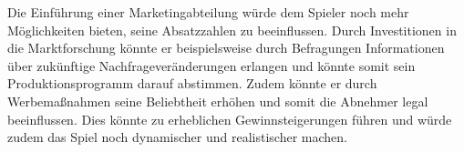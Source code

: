Die Einführung einer Marketingabteilung würde dem Spieler noch mehr Möglichkeiten bieten, seine Absatzzahlen zu beeinflussen. Durch Investitionen in die Marktforschung könnte er beispielsweise durch Befragungen Informationen über zukünftige Nachfrageveränderungen erlangen und könnte somit sein Produktionsprogramm darauf abstimmen. Zudem könnte er durch Werbemaßnahmen seine Beliebtheit erhöhen und somit die Abnehmer legal beeinflussen. Dies könnte zu erheblichen Gewinnsteigerungen führen und würde zudem das Spiel noch dynamischer und realistischer machen.